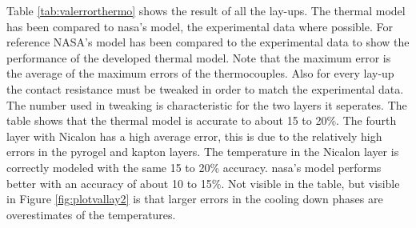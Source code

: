 Table \ref{tab:valerrorthermo} shows the result of all the lay-ups. The thermal model has been compared to \gls{nasa}'s model, the experimental data where possible. For reference NASA's model has been compared to the experimental data to show the performance of the developed thermal model. Note that the maximum error is the average of the maximum errors of the thermocouples. Also for every lay-up the contact resistance must be tweaked in order to match the experimental data. The number used in tweaking is characteristic for the two layers it seperates. The table shows that the thermal model is accurate to about 15 to 20\%. The fourth layer with Nicalon has a high average error, this is due to the relatively high errors in the pyrogel and kapton layers. The temperature in the Nicalon layer is correctly modeled with the same 15 to 20\% accuracy. \gls{nasa}'s model performs better with an accuracy of about 10 to 15\%. Not visible in the table, but visible in Figure \ref{fig:plotvallay2} is that larger errors in the cooling down phases are overestimates of the temperatures.

